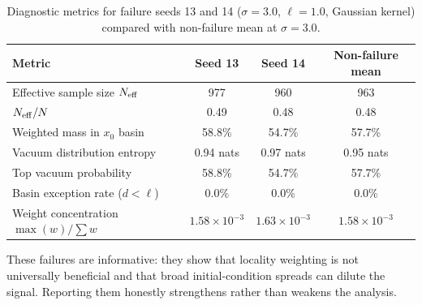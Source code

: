 \begin{table}[t]
  \centering
  \caption{Diagnostic metrics for failure seeds 13 and 14
  ($\sigma=3.0$, $\ell=1.0$, Gaussian kernel) compared with non-failure mean
  at $\sigma=3.0$.}
  \label{tab:failure_diagnostics}
  \small
  \begin{tabular}{lccc}
    \toprule
    Metric & Seed 13 & Seed 14 & Non-failure mean \\
    \midrule
    Effective sample size $N_{\rm eff}$ & 977 & 960 & 963 \\
    $N_{\rm eff} / N$ & 0.49 & 0.48 & 0.48 \\
    Weighted mass in $x_0$ basin & 58.8\% & 54.7\% & 57.7\% \\
    Vacuum distribution entropy & 0.94 nats & 0.97 nats & 0.95 nats \\
    Top vacuum probability & 58.8\% & 54.7\% & 57.7\% \\
    Basin exception rate ($d < \ell$) & 0.0\% & 0.0\% & 0.0\% \\
    Weight concentration $\max(w) / \sum w$ & $1.58\times10^{-3}$ & $1.63\times10^{-3}$ & $1.58\times10^{-3}$ \\
    \bottomrule
  \end{tabular}
\end{table}

These failures are informative: they show that locality weighting is not
universally beneficial and that broad initial-condition spreads can dilute
the signal. Reporting them honestly strengthens rather than weakens the
analysis.
